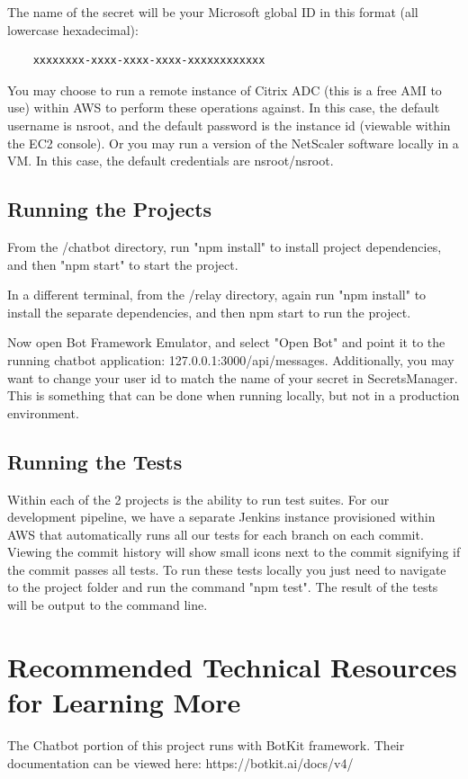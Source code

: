 \documentclass[onecolumn, draftclsnofoot,10pt, compsoc]{IEEEtran}
\begin{document}
The name of the secret will be your Microsoft global ID in this format (all lowercase hexadecimal): 
\begin{verbatim}
    xxxxxxxx-xxxx-xxxx-xxxx-xxxxxxxxxxxx
\end{verbatim}

You may choose to run a remote instance of Citrix ADC (this is a free AMI to use) within AWS to perform these operations against.
In this case, the default username is nsroot, and the default password is the instance id (viewable within the EC2 console).
Or you may run a version of the NetScaler software locally in a VM.
In this case, the default credentials are nsroot/nsroot.

\subsection{Running the Projects}
From the /chatbot directory, run "npm install" to install project dependencies, and then "npm start" to start the project.

In a different terminal, from the /relay directory, again run "npm install" to install the separate dependencies, and then npm start to run the project.

Now open Bot Framework Emulator, and select "Open Bot" and point it to the running chatbot application: 127.0.0.1:3000/api/messages.
Additionally, you may want to change your user id to match the name of your secret in SecretsManager.
This is something that can be done when running locally, but not in a production environment.

\subsection{Running the Tests}
Within each of the 2 projects is the ability to run test suites.
For our development pipeline, we have a separate Jenkins instance provisioned within AWS that automatically runs all our tests for each branch on each commit.
Viewing the commit history will show small icons next to the commit signifying if the commit passes all tests.
To run these tests locally you just need to navigate to the project folder and run the command "npm test".
The result of the tests will be output to the command line.

\section{Recommended Technical Resources for Learning More}
    The Chatbot portion of this project runs with BotKit framework.
    Their documentation can be viewed here: https://botkit.ai/docs/v4/
    
\end{document}
